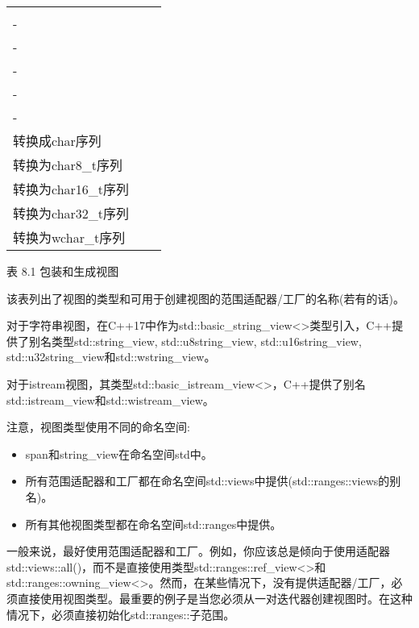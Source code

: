 \begin{longtable}[c]{|l|l|l|}
\begin{tabular}[c]{@{}l@{}}-\\ -\\ -\\ -\\ -\\ -\end{tabular} &
\begin{tabular}[c]{@{}l@{}}字符的只读视图\\   转换成char序列\\   转换为char8\_t序列\\   转换为char16\_t序列\\   转换为char32\_t序列\\   转换为wchar\_t序列\end{tabular} \\ \hline
\end{longtable}

\begin{center}
表 8.1 包装和生成视图
\end{center}

该表列出了视图的类型和可用于创建视图的范围适配器/工厂的名称(若有的话)。

对于字符串视图，在C++17中作为std::basic\_string\_view<>类型引入，C++提供了别名类型std::string\_view, std::u8string\_view, std::u16string\_view, std::u32string\_view和std::wstring\_view。

对于istream视图，其类型std::basic\_istream\_view<>，C++提供了别名std::istream\_view和std::wistream\_view。

注意，视图类型使用不同的命名空间:

\begin{itemize}
\item
span和string\_view在命名空间std中。

\item
所有范围适配器和工厂都在命名空间std::views中提供(std::ranges::views的别名)。

\item
所有其他视图类型都在命名空间std::ranges中提供。
\end{itemize}

一般来说，最好使用范围适配器和工厂。例如，你应该总是倾向于使用适配器std::views::all()，而不是直接使用类型std::ranges::ref\_view<>和std::ranges::owning\_view<>。然而，在某些情况下，没有提供适配器/工厂，必须直接使用视图类型。最重要的例子是当您必须从一对迭代器创建视图时。在这种情况下，必须直接初始化std::ranges::子范围。


